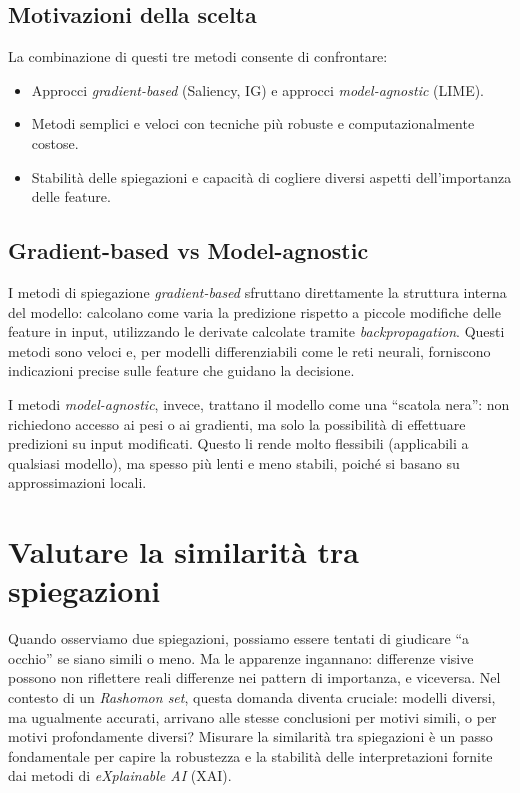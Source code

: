 \documentclass{article}
\begin{document}
\subsection{Motivazioni della scelta}
La combinazione di questi tre metodi consente di confrontare:
\begin{itemize}
      \item Approcci \emph{gradient-based} (Saliency, IG) e approcci \emph{model-agnostic}
            (LIME).
      \item Metodi semplici e veloci con tecniche più robuste e computazionalmente costose.
      \item Stabilità delle spiegazioni e capacità di cogliere diversi aspetti
            dell’importanza delle feature.
\end{itemize}

\subsection{Gradient-based vs Model-agnostic}
I metodi di spiegazione \emph{gradient-based} sfruttano direttamente la
struttura interna del modello: calcolano come varia la predizione rispetto a
piccole modifiche delle feature in input, utilizzando le derivate calcolate
tramite \emph{backpropagation}. Questi metodi sono veloci e, per modelli
differenziabili come le reti neurali, forniscono indicazioni precise sulle
feature che guidano la decisione.

I metodi \emph{model-agnostic}, invece, trattano il modello come una “scatola
nera”: non richiedono accesso ai pesi o ai gradienti, ma solo la possibilità di
effettuare predizioni su input modificati. Questo li rende molto flessibili
(applicabili a qualsiasi modello), ma spesso più lenti e meno stabili, poiché
si basano su approssimazioni locali.

\section{Valutare la similarità tra spiegazioni}

Quando osserviamo due spiegazioni, possiamo essere tentati di giudicare ``a
occhio'' se siano simili o meno. Ma le apparenze ingannano: differenze visive
possono non riflettere reali differenze nei pattern di importanza, e viceversa.
Nel contesto di un \emph{Rashomon set}, questa domanda diventa cruciale:
modelli diversi, ma ugualmente accurati, arrivano alle stesse conclusioni per
motivi simili, o per motivi profondamente diversi? Misurare la similarità tra
spiegazioni è un passo fondamentale per capire la robustezza e la stabilità
delle interpretazioni fornite dai metodi di \emph{eXplainable AI} (XAI).
\end{document}
